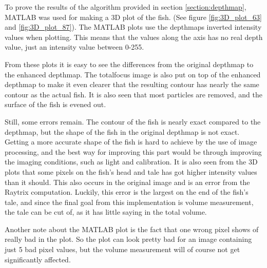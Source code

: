 To prove the results of the algorithm provided in section \ref{section:depthmap}, MATLAB was used for making a 3D plot of the fish. (See figure \ref{fig:3D_plot_63} and \ref{fig:3D_plot_87}). The MATLAB plots use the depthmaps inverted intensity values when plotting. This means that the values along the axis has no real depth value, just an intensity value between 0-255.\cite{website:mathworks_meshgrid}

From these plots it is easy to see the differences from the original depthmap to the enhanced depthmap. The totalfocus image is also put on top of the enhanced depthmap to make it even clearer that the resulting contour has nearly the same contour as the actual fish. It is also seen that most particles are removed, and the surface of the fish is evened out.

Still, some errors remain. The contour of the fish is nearly exact compared to the depthmap, but the shape of the fish in the original depthmap is not exact. Getting a more accurate shape of the fish is hard to achieve by the use of image processing, and the best way for improving this part would be through improving the imaging conditions, such as light and calibration. 
It is also seen from the 3D plots that some pixels on the fish’s head and tale has got higher intensity values than it should.
This also occurs in the original image and is an error from the Raytrix computation. Luckily, this error is the largest on the end of the fish’s tale, and since the final goal from this implementation is volume measurement, the tale can be cut of, as it has little saying in the total volume. 

Another note about the MATLAB plot is the fact that one wrong pixel shows of really bad in the plot. So the plot can look pretty bad for an image containing just 5 bad pixel values, but the volume measurement will of course not get significantly affected.



